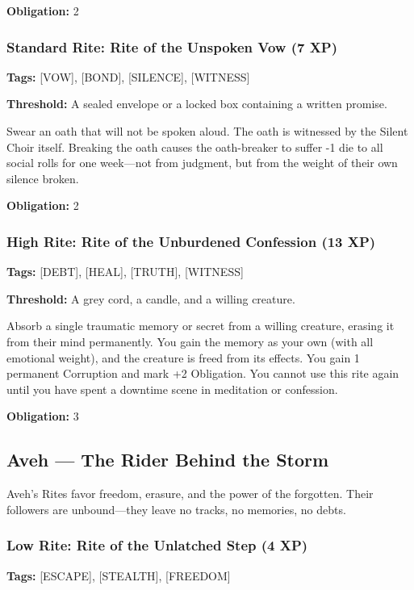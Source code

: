 \textbf{Obligation:} 2

\subsubsection{Standard Rite: Rite of the Unspoken Vow (7 XP)}

\textbf{Tags:} [VOW], [BOND], [SILENCE], [WITNESS]

\textbf{Threshold:} A sealed envelope or a locked box containing a written promise.

Swear an oath that will not be spoken aloud. The oath is witnessed by the Silent Choir itself. Breaking the oath causes the oath-breaker to suffer -1 die to all social rolls for one week—not from judgment, but from the weight of their own silence broken.

\textbf{Obligation:} 2

\subsubsection{High Rite: Rite of the Unburdened Confession (13 XP)}

\textbf{Tags:} [DEBT], [HEAL], [TRUTH], [WITNESS]

\textbf{Threshold:} A grey cord, a candle, and a willing creature.

Absorb a single traumatic memory or secret from a willing creature, erasing it from their mind permanently. You gain the memory as your own (with all emotional weight), and the creature is freed from its effects. You gain 1 permanent Corruption and mark +2 Obligation. You cannot use this rite again until you have spent a downtime scene in meditation or confession.

\textbf{Obligation:} 3

\subsection{Aveh — The Rider Behind the Storm}

Aveh's Rites favor freedom, erasure, and the power of the forgotten. Their followers are unbound—they leave no tracks, no memories, no debts.

\subsubsection{Low Rite: Rite of the Unlatched Step (4 XP)}

\textbf{Tags:} [ESCAPE], [STEALTH], [FREEDOM]

